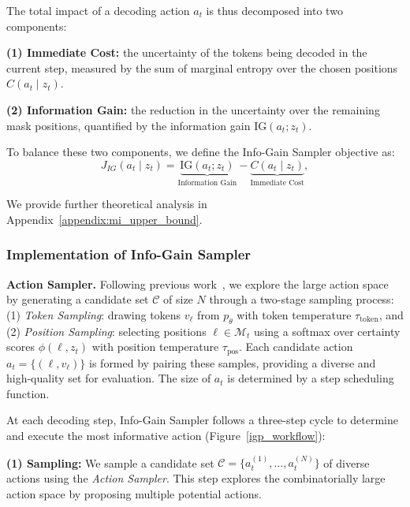 The total impact of a decoding action $a_t$ is thus decomposed into two components:

\textbf{(1) Immediate Cost:} the uncertainty of the tokens being decoded in the current step, measured by the sum of marginal entropy over the chosen positions $C(a_t \mid z_t)$.

\textbf{(2) Information Gain:} the reduction in the uncertainty over the remaining mask positions, quantified by the information gain $\text{IG}(a_t; z_t)$.

To balance these two components, we define the Info-Gain Sampler objective as:
\begin{equation}
J_{IG}(a_t \mid z_t) = \underbrace{\text{IG}(a_t ;z_t)}_{\text{Information Gain}}-\underbrace{C(a_t \mid z_t)}_{\text{Immediate Cost}},
\label{eq:igp_objective}
\end{equation}

We provide further theoretical analysis in Appendix~\ref{appendix:mi_upper_bound}.

\subsubsection{Implementation of Info-Gain Sampler}


\noindent\textbf{Action Sampler.} Following previous work~\cite{opendllm2025,yang2025mmada}, we explore the large action space by generating a candidate set $\mathcal{C}$ of size $N$ through a two-stage sampling process: (1) \textit{Token Sampling}: drawing tokens $v_\ell$ from $p_\theta$ with token temperature $\tau_{\text{token}}$, and (2) \textit{Position Sampling}: selecting positions $\ell \in \mathcal{M}_t$ using a softmax over certainty scores $\phi(\ell,z_t)$ with position temperature $\tau_{\text{pos}}$. Each candidate action $a_t = \{(\ell, v_\ell)\}$ is formed by pairing these samples, providing a diverse and high-quality set for evaluation. The size of $a_t$ is determined by a step scheduling function.


At each decoding step, Info-Gain Sampler follows a three-step cycle to determine and execute the most informative action (Figure~\ref{igp_workflow}):

\textbf{(1) Sampling:} We sample a candidate set $\mathcal{C} = \{a_t^{(1)}, \dots, a_t^{(N)}\}$ of diverse actions using the \textit{Action Sampler}. This step explores the combinatorially large action space by proposing multiple potential actions.

